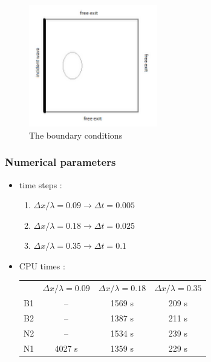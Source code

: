 \begin{figure}[h!]
  \centering
    \includegraphics[width=0.5\textwidth]{boundary_limit.png}
      \caption{The boundary conditions}
\end{figure}

\subsubsection{Numerical parameters}
\begin{itemize}
\item time steps :
	\begin{enumerate}
    \item $\Delta x / \lambda = 0.09  \rightarrow \Delta t = 0.005 $
    \item $\Delta x / \lambda = 0.18  \rightarrow \Delta t = 0.025 $
    \item $\Delta x / \lambda = 0.35  \rightarrow \Delta t = 0.1 $
  \end{enumerate}
\item CPU times : \\
\begin{tabular}{cccc}
 & $\Delta x / \lambda = 0.09 $ &$\Delta x / \lambda = 0.18 $&$\Delta x / \lambda = 0.35 $\\
 B1 & -- & 1569 s & 209 s \\
 B2 & -- & 1387 s & 211 s \\
 N2 & -- & 1534 s & 239 s \\
 N1 & 4027 s & 1359 s & 229 s\\

\end{tabular}
\end{itemize}

